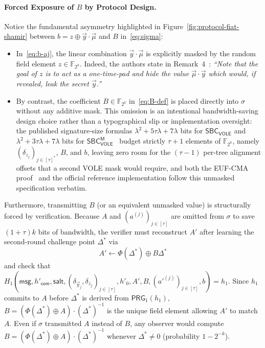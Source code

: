 \documentclass[11pt,a4paper]{article}
\theoremstyle{definition}
\theoremstyle{remark}
\newcommand{\Ftwok}{\mathbb{F}_{2^k}}
\newcommand{\SBCVOLE}{\mathsf{SBC}_{\mathsf{VOLE}}}
\newcommand{\SBCVOLEM}{\mathsf{SBC}_{\mathsf{VOLE}}^{\mathsf{M}}}
\newcommand{\salt}{\mathsf{salt}}
\newcommand{\msg}{\mathsf{msg}}
\newcommand{\com}{\mathsf{com}}
\newcommand{\PRG}{\mathsf{PRG}}
\begin{document}
\paragraph{Forced Exposure of $B$ by Protocol Design.}
Notice the fundamental asymmetry highlighted in Figure~\ref{fig:protocol-fiat-shamir} between $b = z \oplus \vec{y} \cdot \vec{\mu}$ and $B$ in~\eqref{eq:sigma}:
\begin{itemize}[leftmargin=2em]
    \item In~\eqref{eq:b-aj}, the linear combination $\vec{y} \cdot \vec{\mu}$ is explicitly masked by the random field element $z \in \Ftwok$. Indeed, the authors state in Remark~4~\cite[p.~14, full version]{HJ25}: \emph{``Note that the goal of $z$ is to act as a one-time-pad and hide the value $\vec{\mu} \cdot \vec{y}$ which would, if revealed, leak the secret $\vec{y}$.''}
    \item By contrast, the coefficient $B \in \Ftwok$ in~\eqref{eq:B-def} is placed directly into $\sigma$ without any additive mask. This omission is an intentional bandwidth-saving design choice rather than a typographical slip or implementation oversight: the published signature-size formulas $\lambda^2 + 5\tau\lambda + 7\lambda$ bits for $\SBCVOLE$ and $\lambda^2 + 3\tau\lambda + 7\lambda$ bits for $\SBCVOLEM$~\cite[Sections~5.2 and~6.1]{HJ25} budget strictly $\tau + 1$ elements of $\Ftwok$, namely $(\delta_{z_j})_{j \in [\tau]^*}$, $B$, and $b$, leaving zero room for the $(\tau - 1)$ per-tree alignment offsets that a second VOLE mask would require, and both the EUF-CMA proof~\cite[Appendix~A, full version]{HJ25} and the official reference implementation follow this unmasked specification verbatim.
\end{itemize}
Furthermore, transmitting $B$ (or an equivalent unmasked value) is structurally forced by verification. Because $A$ and $(a^{(j)})_{j \in [\tau]}$ are omitted from $\sigma$ to save $(1 + \tau)k$ bits of bandwidth, the verifier must reconstruct $A'$ after learning the second-round challenge point $\Delta^*$ via
\begin{equation}
\label{eq:A-reconstruct}
A' \leftarrow \Phi(\Delta^*) \oplus B\Delta^*
\end{equation}
and check that $H_1(\msg, h'_{\com}, \salt, (\delta_{\vec{y}_j}, \delta_{z_j})_{j \in [\tau]}, h'_0, A', B, (a'^{(j)})_{j \in [\tau]}, b) = h_1$. Since $h_1$ commits to $A$ before $\Delta^*$ is derived from $\PRG_1(h_1)$, $B = (\Phi(\Delta^*) \oplus A) \cdot (\Delta^*)^{-1}$ is the unique field element allowing $A'$ to match $A$. Even if $\sigma$ transmitted $A$ instead of $B$, any observer would compute $B = (\Phi(\Delta^*) \oplus A) \cdot (\Delta^*)^{-1}$ whenever $\Delta^* \neq 0$ (probability $1 - 2^{-k}$).
\end{document}
